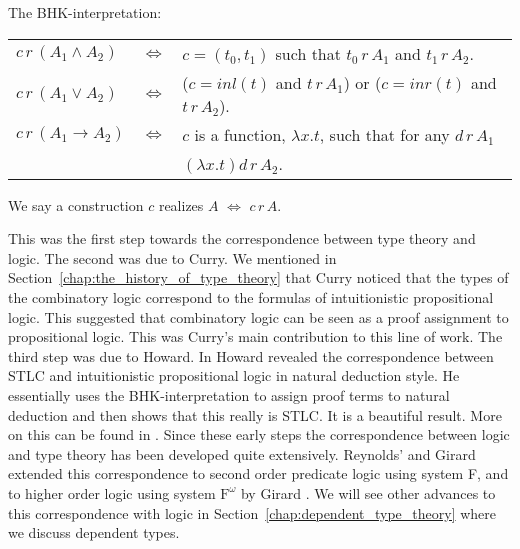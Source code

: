 \begin{definition}
  \label{def:bhk-interpretation}  
    The BHK-interpretation:
  \begin{center}
    \begin{tabular}{lll}
      $c\,r\,(A_1 \land A_2)$ & $\iff$ & $c = (t_0,t_1)$ such that $t_0\,r\,A_1$ and 
            $t_1\,r\,A_2$.\\
      $c\,r\,(A_1 \lor A_2)$  & $\iff$ & ($c = inl(t)$ and $t\,r\,A_1$) or ($c = inr(t)$ and 
            $t\,r\,A_2$).\\
      $c\,r\,(A_1 \to A_2)$   & $\iff$ & $c$ is a function, $\lambda x.t$, such that for any 
            $d\,r\,A_1$ \\
                              &     & $(\lambda x.t)d\,r\,A_2$.
    \end{tabular}
  \end{center}
  We say a construction $c$ realizes $A$ $\iff$ $c\,r\,A$.      
\end{definition}
This was the first step towards the correspondence between type theory
and logic.  The second was due to Curry.  We mentioned in
Section~\ref{chap:the_history_of_type_theory} that Curry noticed that
the types of the combinatory logic correspond
to the formulas of intuitionistic propositional logic.  This suggested
that combinatory logic can be seen as a proof assignment to
propositional logic.  This was Curry's main contribution to this line
of work.  The third step was due to Howard.  In \cite{Howard:1980}
Howard revealed the correspondence between STLC and intuitionistic
propositional logic in natural deduction style.  He essentially uses
the BHK-interpretation to assign proof terms to natural deduction and
then shows that this really is STLC.  It is a beautiful result.  More
on this can be found in
\cite{Griffin:1990,Howard:1980,Mints:2000,Murthy:1991,Sorensen:2006,Troelstra:1991}.
Since these early steps the correspondence between logic and type
theory has been developed quite extensively.  Reynolds' and Girard
extended this correspondence to second order predicate logic using
system F, and to higher order logic using system $\text{F}^\omega$ by
Girard \cite{Wadler:2007,Girard:1971}.  We will see other advances to
this correspondence with logic in
Section~\ref{chap:dependent_type_theory} where we discuss dependent
types.

